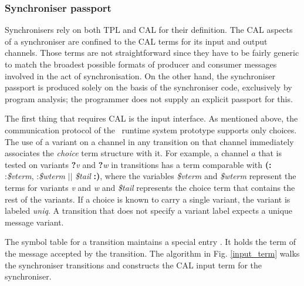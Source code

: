   \subsubsection{Synchroniser passport}
Synchronisers rely on both TPL and CAL for their definition. The CAL aspects of a synchroniser are confined to the CAL terms for its input and output channels. Those terms are not straightforward since they have to be fairly generic to match the broadest possible formats of producer and consumer messages involved in the act of synchronisation. On the other hand, the synchroniser passport is produced solely on the basis of the synchroniser code, exclusively by program analysis; the programmer does not supply an explicit passport for this.

The first thing that requires CAL is the input interface. As mentioned above, the communication protocol of the \ak\ runtime system prototype supports only choices. The use of a variant on a channel in any transition on that channel immediately associates the \emph{choice} term structure with it. For example, a channel $a$ that is tested on variants \textbf{?}\emph{v} and \textbf{?}\emph{w} in transitions has a term comparable with \textbf{(:} :\emph{\$vterm}, :\emph{\$wterm} $||$ \emph{\$tail} \textbf{:)}, where the variables \emph{\$vterm} and \emph{\$wterm} represent the terms for variants \emph{v} and \emph{w} and \emph{\$tail} represents the choice term that contains the rest of the variants. If a choice is known to carry a single variant, the variant is labeled \emph{uniq}. A transition that does not specify a variant label expects a unique message variant.

The symbol table for a transition maintains a special entry . It holds the term of the message accepted by the transition. The algorithm in Fig. \ref{input_term} walks the synchroniser transitions and constructs the CAL input term for the synchroniser.

